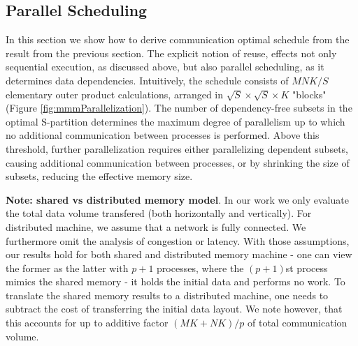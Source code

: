 \documentclass[sigplan,review,anonymous]{acmart}\settopmatter{printfolios=true,printccs=false,printacmref=false}
\newcommand{\macb}[1]{\textbf{\textsf{#1}}}
\begin{document}
\subsection{Parallel Scheduling}
\label{sec:parScheduling}

In this section we show how to derive communication optimal schedule from the 
result from the previous section.
The explicit notion of reuse, effects not only sequential execution, as 
discussed above, but also parallel scheduling, as it determines data 
dependencies.
 Intuitively, the schedule consists 
of $MNK/S$ elementary outer product calculations, arranged in $\sqrt{S} \times 
\sqrt{S} \times K$ "blocks" (Figure \ref{fig:mmmParallelization}). The number 
of dependency-free 
subsets in the optimal S-partition determines the maximum degree of parallelism 
up 
to which no additional communication between processes is performed. Above 
this 
threshold, 
further parallelization requires either parallelizing dependent subsets, 
causing additional communication between processes, or by shrinking the size of 
subsets, reducing the effective memory size.

\macb{Note: shared vs distributed memory model}. In our work we only evaluate 
the total data volume transfered (both horizontally and vertically). For 
distributed machine, we assume that a network is fully connected. We 
furthermore omit the analysis of congestion or latency. With those assumptions,
our results hold for both shared and distributed memory machine - one can view 
the former as the latter with $p + 1$ processes, where the 
$(p+1)$st process mimics the shared memory - it holds the initial data and 
performs no work. To translate the shared memory results to a distributed 
machine, one needs to subtract the cost of transferring the initial data 
layout. We note however, that this accounts for up to additive factor $(MK + 
NK)/p$ of total communication volume.
\end{document}

